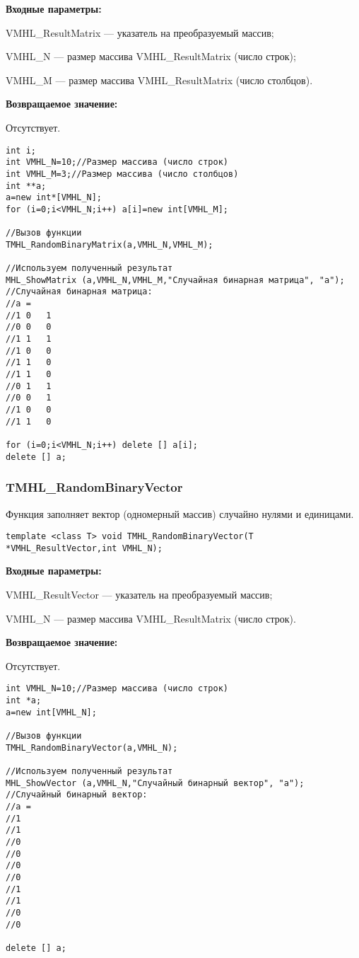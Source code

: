 \documentclass[a4paper,12pt]{article}
\begin{document}
\textbf{Входные параметры:}
 
VMHL\_ResultMatrix --- указатель на преобразуемый массив;
 
VMHL\_N --- размер массива VMHL\_ResultMatrix (число строк);
 
VMHL\_M --- размер массива VMHL\_ResultMatrix (число столбцов). 

\textbf{Возвращаемое значение:}

Отсутствует.


\begin{lstlisting}[label=code_use_TMHL_RandomBinaryMatrix,caption=Пример использования]
int i;
int VMHL_N=10;//Размер массива (число строк)
int VMHL_M=3;//Размер массива (число столбцов)
int **a;
a=new int*[VMHL_N];
for (i=0;i<VMHL_N;i++) a[i]=new int[VMHL_M];

//Вызов функции
TMHL_RandomBinaryMatrix(a,VMHL_N,VMHL_M);

//Используем полученный результат
MHL_ShowMatrix (a,VMHL_N,VMHL_M,"Случайная бинарная матрица", "a");
//Случайная бинарная матрица:
//a =
//1	0	1
//0	0	0
//1	1	1
//1	0	0
//1	1	0
//1	1	0
//0	1	1
//0	0	1
//1	0	0
//1	1	0

for (i=0;i<VMHL_N;i++) delete [] a[i];
delete [] a;
\end{lstlisting}

\subsubsection{TMHL\_RandomBinaryVector}\label{TMHL_RandomBinaryVector}

Функция заполняет вектор (одномерный массив) случайно нулями и единицами.


\begin{lstlisting}[label=code_syntax_TMHL_RandomBinaryVector,caption=Синтаксис]
template <class T> void TMHL_RandomBinaryVector(T *VMHL_ResultVector,int VMHL_N);
\end{lstlisting}

\textbf{Входные параметры:}
 
VMHL\_ResultVector --- указатель на преобразуемый массив;
 
VMHL\_N --- размер массива VMHL\_ResultMatrix (число строк).

\textbf{Возвращаемое значение:}

Отсутствует.


\begin{lstlisting}[label=code_use_TMHL_RandomBinaryVector,caption=Пример использования]
int VMHL_N=10;//Размер массива (число строк)
int *a;
a=new int[VMHL_N];

//Вызов функции
TMHL_RandomBinaryVector(a,VMHL_N);

//Используем полученный результат
MHL_ShowVector (a,VMHL_N,"Случайный бинарный вектор", "a");
//Случайный бинарный вектор:
//a =
//1
//1
//0
//0
//0
//0
//1
//1
//0
//0

delete [] a;
\end{lstlisting}
\end{document}
